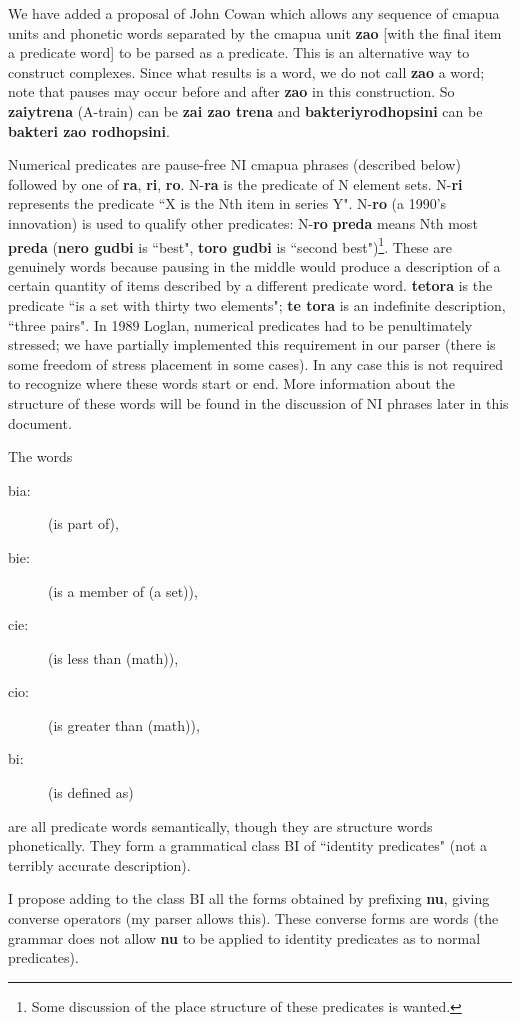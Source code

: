 \documentclass[12pt]{book}
\begin{document}
We have added a proposal of John Cowan which allows any sequence of cmapua units and phonetic words separated by the cmapua unit {\bf zao} [with the final item a predicate word] to be parsed as a predicate.
This is an alternative way to construct complexes.  Since what results is a word, we do not call {\bf zao} a word;  note that pauses may occur before and after {\bf zao} in
this construction.  So {\bf zaiytrena} (A-train) can be {\bf zai zao trena} and {\bf bakteriyrodhopsini} can be {\bf bakteri zao rodhopsini}.

Numerical predicates are pause-free NI cmapua phrases (described below) followed by one of {\bf ra}, {\bf ri}, {\bf ro}.  N-{\bf ra} is the predicate of N element sets.
N-{\bf ri} represents the predicate ``X is the Nth item in series Y".  N-{\bf ro} (a 1990's innovation) is used to qualify other predicates:  N-{\bf ro} {\bf preda} means
Nth most {\bf preda} ({\bf nero gudbi} is ``best", {\bf toro gudbi} is ``second best")\footnote{Some discussion of the place structure of these predicates is wanted.}.  These are genuinely words because pausing in the middle would produce a description of a certain quantity of items described by a different predicate word.  {\bf tetora} is the predicate ``is a set with thirty two elements";  {\bf te tora} is an indefinite description, ``three pairs".
In 1989 Loglan, numerical predicates had to be penultimately stressed;  we have partially implemented this requirement in our parser (there is some freedom of stress placement in some cases).  In any case this is not required to recognize where these words start or end.   More information about the structure of these words will be found in the discussion of NI phrases later in this document.

The words 

\begin{description}
\item[bia:] (is part of), 
\item[bie:] (is a member of (a set)), 
\item[cie:] (is less than (math)), 
\item[cio:] (is greater than (math)), 
\item[bi:]  (is defined as)
\end{description}
 are all predicate words semantically, though they are structure words phonetically.   They form a grammatical class BI of ``identity predicates" (not a terribly accurate description).

I propose adding to the class BI  all the forms obtained by prefixing {\bf nu}, giving converse operators (my parser allows this).  These converse forms are words (the grammar does  not allow {\bf nu} to be applied to identity predicates as to normal predicates).
\end{document}
